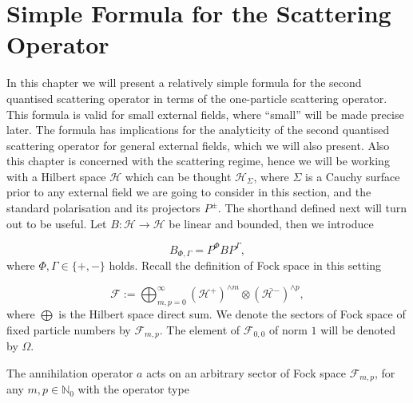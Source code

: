 \documentclass[b5paper,draft,openbib,12pt]{memoir}
\begin{document}
\section[Simple Formula for the Scattering Operator][Simple Formula]{Simple Formula for the Scattering Operator}
In this chapter we will present a relatively simple 
formula for the second quantised scattering operator 
in terms of the one-particle scattering operator. 
This formula is valid for small external fields, where 
``small'' will be made precise later. The formula has 
implications for the analyticity of the second quantised 
scattering operator for general external fields, which 
we will also present. Also this chapter is concerned 
with the scattering regime, hence we will be working 
with a Hilbert space \(\mathcal{H}\) which can be 
thought \(\mathcal{H}_{\Sigma}\), where \(\Sigma\)
is a Cauchy surface prior to any external field 
we are going to consider in this section, and 
the standard polarisation and its projectors 
\(P^\pm\). The shorthand defined next will turn out 
to be useful. Let \(B:\mathcal{H}\rightarrow \mathcal{H}\)
be linear and bounded, then we introduce 

\begin{equation}
  B_{\mathsf{\Phi},\mathsf{\Gamma}}=P^{\mathsf{\Phi}}B P^{\mathsf{\Gamma}},
\end{equation}
where \(\mathsf{\Phi},\mathsf{\Gamma}\in \{+,-\}\) holds.
Recall the definition of Fock space in this setting 

\begin{equation}
  \mathcal{F}:=\bigoplus_{m,p=0}^\infty \left(\mathcal{H}^+ \right)^{\wedge m} \otimes \left(\overline{\mathcal{H}^- }\right)^{\wedge p},
\end{equation}
where \(\bigoplus\) is the Hilbert space direct sum. 
We denote the sectors of Fock space of fixed particle
numbers by \(\mathcal{F}_{m,p}\). The element of
\(\mathcal{F}_{0,0}\) of norm \(1\) will be 
denoted by \(\Omega\).

The
annihilation operator \(a\) acts on an arbitrary sector of Fock space
\(\mathcal{F}_{m,p}\), for any \(m,p\in\mathbb{N}_0\) with the operator type
\end{document}
